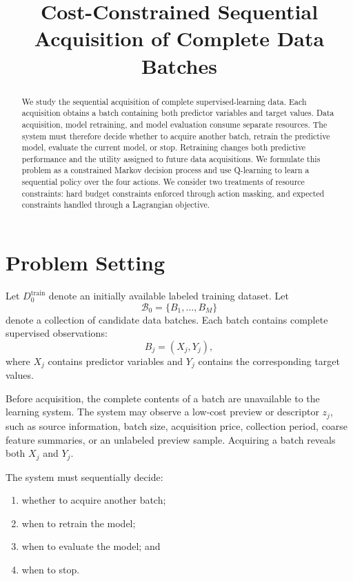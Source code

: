 \documentclass[11pt,letterpaper]{article}
\title{Cost-Constrained Sequential Acquisition of Complete Data Batches}
\author{}
\date{}
\begin{document}
\maketitle

\begin{abstract}
We study the sequential acquisition of complete supervised-learning data.
Each acquisition obtains a batch containing both predictor variables and
target values. Data acquisition, model retraining, and model evaluation
consume separate resources. The system must therefore decide whether to
acquire another batch, retrain the predictive model, evaluate the current
model, or stop. Retraining changes both predictive performance and the utility
assigned to future data acquisitions. We formulate this problem as a
constrained Markov decision process and use Q-learning to learn a sequential
policy over the four actions. We consider two treatments of resource
constraints: hard budget constraints enforced through action masking, and
expected constraints handled through a Lagrangian objective.
\end{abstract}

\section{Problem Setting}

Let \(D^{\mathrm{train}}_0\) denote an initially available labeled training
dataset. Let
\[
    \mathcal{B}_0=\{B_1,\ldots,B_M\}
\]
denote a collection of candidate data batches. Each batch contains complete
supervised observations:
\[
    B_j=(X_j,Y_j),
\]
where \(X_j\) contains predictor variables and \(Y_j\) contains the
corresponding target values.

Before acquisition, the complete contents of a batch are unavailable to the
learning system. The system may observe a low-cost preview or descriptor
\(z_j\), such as source information, batch size, acquisition price,
collection period, coarse feature summaries, or an unlabeled preview sample.
Acquiring a batch reveals both \(X_j\) and \(Y_j\).

The system must sequentially decide:
\begin{enumerate}[label=(\roman*),nosep]
    \item whether to acquire another batch;
    \item when to retrain the model;
    \item when to evaluate the model; and
    \item when to stop.
\end{enumerate}
\end{document}

